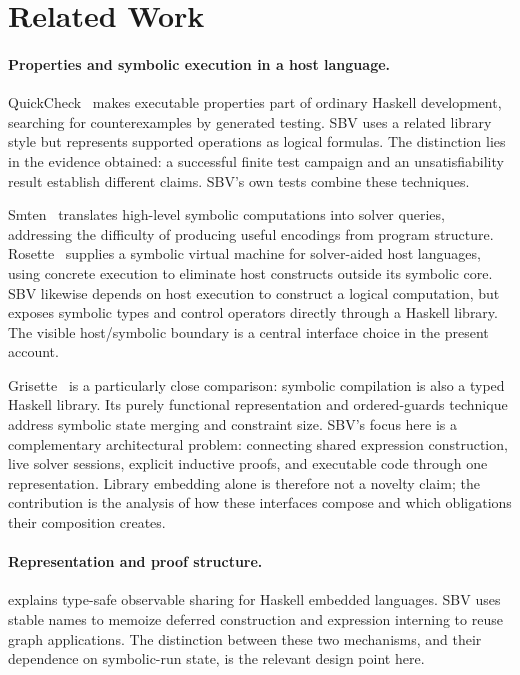 \documentclass[acmsmall,screen,nonacm]{acmart}
\begin{document}
\section{Related Work}
\label{sec:related}

\paragraph{Properties and symbolic execution in a host language.}
QuickCheck~\citep{quickcheck} makes executable properties part of ordinary
Haskell development, searching for counterexamples by generated testing. SBV
uses a related library style but represents supported operations as logical
formulas. The distinction lies in the evidence obtained: a successful finite
test campaign and an unsatisfiability result establish different claims.
SBV's own tests combine these techniques.

Smten~\citep{smten} translates high-level symbolic computations into solver
queries, addressing the difficulty of producing useful encodings from program
structure. Rosette~\citep{rosette} supplies a symbolic virtual machine for
solver-aided host languages, using concrete execution to eliminate host
constructs outside its symbolic core. SBV likewise depends on host execution
to construct a logical computation, but exposes symbolic types and control
operators directly through a Haskell library. The visible host/symbolic boundary
is a central interface choice in the present account.

Grisette~\citep{grisette} is a particularly close comparison: symbolic
compilation is also a typed Haskell library. Its purely functional representation
and ordered-guards technique address symbolic state merging and constraint
size. SBV's focus here is a complementary architectural problem: connecting
shared expression construction, live solver sessions, explicit inductive
proofs, and executable code through one representation. Library embedding
alone is therefore not a novelty claim; the contribution is the analysis of
how these interfaces compose and which obligations their composition creates.

\paragraph{Representation and proof structure.}
\citet{sharing} explains type-safe observable sharing for Haskell embedded
languages. SBV uses stable names to memoize deferred construction and expression
interning to reuse graph applications. The distinction between these two
mechanisms, and their dependence on symbolic-run state, is the relevant design
point here.
\end{document}
